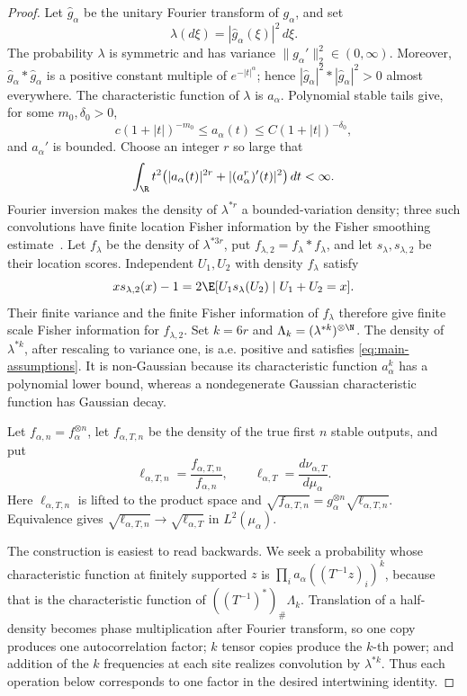\begin{proof}
Let \(\widehat g_\alpha\) be the unitary Fourier transform of \(g_\alpha\),
and set
\[
 \lambda(d\xi)=|\widehat g_\alpha(\xi)|^2\,d\xi.
\]
The probability \(\lambda\) is symmetric and has variance
\(\|g_\alpha'\|_2^2\in(0,\infty)\).
Moreover, \(\widehat g_\alpha*\widehat g_\alpha\) is a positive constant multiple of
\(e^{-|t|^\alpha}\); hence
\(|\widehat g_\alpha|^2*|\widehat g_\alpha|^2>0\) almost everywhere.
The characteristic function of \(\lambda\) is \(a_\alpha\).
Polynomial stable tails give, for some \(m_0,\delta_0>0\),
\[
 c(1+|t|)^{-m_0}\le a_\alpha(t)
 \le C(1+|t|)^{-\delta_0},
\]
and \(a_\alpha'\) is bounded.
Choose an integer \(r\) so large that
\[
 \int_\R t^2\bigl(|a_\alpha(t)|^{2r}
                 +|(a_\alpha^r)'(t)|^2\bigr)\,dt<\infty.
\]
Fourier inversion makes the density of \(\lambda^{*r}\) a bounded-variation
density; three such convolutions have finite location Fisher information by
the Fisher smoothing estimate~\cite{bobkov2014stable}.
Let \(f_\lambda\) be the density of \(\lambda^{*3r}\), put
\(f_{\lambda,2}=f_\lambda*f_\lambda\), and let
\(s_\lambda,s_{\lambda,2}\) be their location scores.
Independent \(U_1,U_2\) with density \(f_\lambda\) satisfy
\[
 x s_{\lambda,2}(x)-1
 =2\E[U_1s_\lambda(U_2)\mid U_1+U_2=x].
\]
Their finite variance and the finite Fisher information of \(f_\lambda\)
therefore
give finite scale Fisher information for \(f_{\lambda,2}\).
Set \(k=6r\) and \(\Lambda_k=(\lambda^{*k})^{\otimes\N}\).
The density of \(\lambda^{*k}\), after
rescaling to variance one, is a.e. positive and satisfies
\eqref{eq:main-assumptions}.
It is non-Gaussian because its characteristic function
\(a_\alpha^k\) has a polynomial lower bound, whereas a nondegenerate
Gaussian characteristic function has Gaussian decay.

Let \(f_{\alpha,n}=f_\alpha^{\otimes n}\), let \(f_{\alpha,T,n}\) be the
density of the true first \(n\) stable outputs, and put
\[
 \ell_{\alpha,T,n}=\frac{f_{\alpha,T,n}}{f_{\alpha,n}},
 \qquad
 \ell_{\alpha,T}=\frac{d\nu_{\alpha,T}}{d\mu_\alpha}.
\]
Here \(\ell_{\alpha,T,n}\) is lifted to the product space and
\(\sqrt{f_{\alpha,T,n}}
  =g_\alpha^{\otimes n}\sqrt{\ell_{\alpha,T,n}}\).
Equivalence gives
\(\sqrt{\ell_{\alpha,T,n}}\to\sqrt{\ell_{\alpha,T}}\)
in \(L^2(\mu_\alpha)\).

The construction is easiest to read backwards.  We seek a probability whose
characteristic function at finitely supported \(z\) is
\(\prod_i a_\alpha((T^{-1}z)_i)^k\), because that is the characteristic
function of \(((T^{-1})^*)_\#\Lambda_k\).  Translation of a half-density
becomes phase multiplication after Fourier transform, so one copy produces
one autocorrelation factor; \(k\) tensor copies produce the \(k\)-th power;
and addition of the \(k\) frequencies at each site realizes convolution by
\(\lambda^{*k}\).  Thus each operation below corresponds to one factor in the
desired intertwining identity.


\end{proof}
